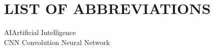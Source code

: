 \chapter*{LIST OF ABBREVIATIONS}
AI\tabto{6em}Artificial Intelligence\\
CNN\tabto{6em} Convolution Neural Network\\